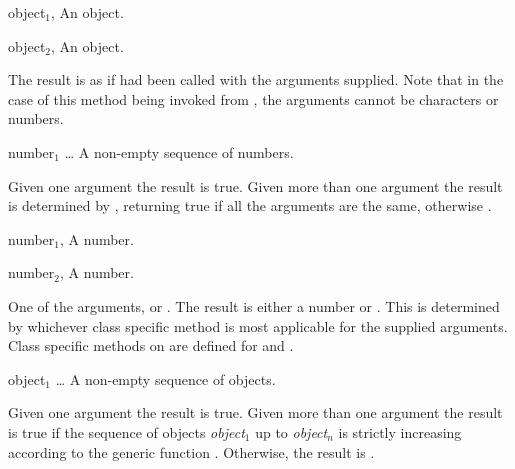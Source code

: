 \begin{optDefinition}
%
\begin{specargs}
    \item[object$_1$, \classref{object}] An object.
    \item[object$_2$, \classref{object}] An object.
\end{specargs}
%
\result%
The result is as if  had been called with the arguments
supplied.
%
\remarks%
Note that in the case of this method being invoked from , the
arguments cannot be characters or numbers.

\function{=}
%
\begin{arguments}
    \item[{number$_1$ \ldots}] A non-empty sequence of numbers.
\end{arguments}
%
\result%
Given one argument the result is true.  Given more than one argument the result
is determined by , returning true if all the arguments are
the same, otherwise \nil{}.

%
\begin{genericargs}
    \item[number$_1$, \classref{number}] A number.
    \item[number$_2$, \classref{number}] A number.
\end{genericargs}
%
\result%
One of the arguments, or \nil{}.
%
\remarks%
The result is either a number or \nil{}.  This is determined by whichever
class specific method is most applicable for the supplied arguments.
%
\seealso%
Class specific methods on  are defined for
 and .

%
%

\function{<}
%
\begin{arguments}
    \item[object$_1$ \ldots] A non-empty sequence of objects.
\end{arguments}
%
\result%
Given one argument the result is true.  Given more than one argument the result
is true if the sequence of objects {\em object$_1$} up to {\em object$_n$} is
strictly increasing according to the generic function .
Otherwise, the result is \nil{}.


\end{optDefinition}
